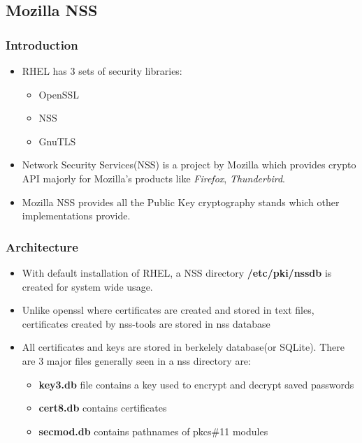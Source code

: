 \documentclass[12pt]{report}
\begin{document}
    \subsection{Mozilla NSS}
        \subsubsection{Introduction}
            \begin{itemize}
                \item RHEL has 3 sets of security libraries:
                        \begin{itemize}
                            \item OpenSSL
                            \item NSS
                            \item GnuTLS
                        \end{itemize}
                \item Network Security Services(NSS) is a project by Mozilla which provides crypto API majorly for Mozilla's products like 
                    \textit{Firefox}, \textit{Thunderbird}. 
                \item Mozilla NSS provides all the Public Key cryptography stands which other implementations provide. 
            \end{itemize}
        \subsubsection{Architecture}
            \begin{itemize}
                \item With default installation of RHEL, a NSS directory \textbf{/etc/pki/nssdb} is created for system wide usage. 
                \item Unlike openssl where certificates are created and stored in text files, certificates created by nss-tools are stored in nss database
                \item All certificates and keys  are stored in berkelely database(or SQLite). There are 3 major files generally seen in a nss directory are:
                    \begin{itemize}
                        \item \textbf{key3.db} file contains a key used to encrypt and decrypt saved passwords
                        \item \textbf{cert8.db} contains certificates
                        \item \textbf{secmod.db} contains pathnames of pkcs\#11 modules
                    \end{itemize}
             \end{itemize}
\end{document}
